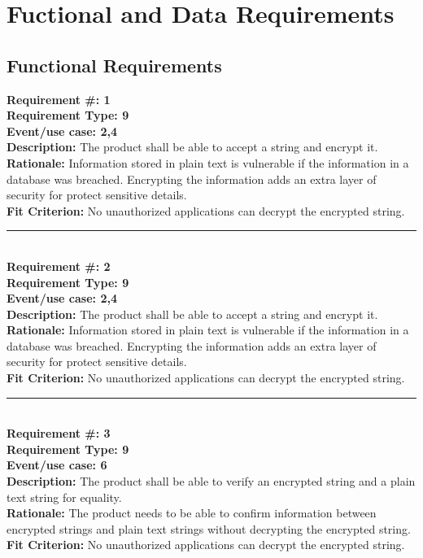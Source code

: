 \documentclass[12pt]{article}
\begin{document}
\section{Fuctional and Data Requirements}

\subsection{Functional Requirements}

	\textbf{Requirement \#: 1}\\
	\textbf{Requirement Type: 9	}\\
	\textbf{Event/use case: 2,4}\\
	\textbf{Description:} The product shall be able to accept a string and encrypt it.\\
	\textbf{Rationale:} Information stored in plain text is vulnerable if the information in a database was breached. Encrypting the information adds an extra layer of security for protect sensitive details.\\
	\textbf{Fit Criterion:} No unauthorized applications can decrypt the encrypted string.



	\noindent\rule{12cm}{0.4pt} \\ 

	\noindent\textbf{Requirement \#: 2}\\
	\textbf{Requirement Type: 9	}\\
	\textbf{Event/use case: 2,4}\\
	\textbf{Description:} The product shall be able to accept a string and encrypt it.\\
	\textbf{Rationale:} Information stored in plain text is vulnerable if the information in a database was breached. Encrypting the information adds an extra layer of security for protect sensitive details.\\
	\textbf{Fit Criterion:} No unauthorized applications can decrypt the encrypted string.

	\noindent\rule{12cm}{0.4pt} \\

	\noindent\textbf{Requirement \#: 3}\\
	\textbf{Requirement Type: 9	}\\
	\textbf{Event/use case: 6}\\
	\textbf{Description:} The product shall be able to verify an encrypted string and a plain text string for equality.\\
	\textbf{Rationale:} The product needs to be able to confirm information between encrypted strings and plain text strings without decrypting the encrypted string.\\
	\textbf{Fit Criterion:} No unauthorized applications can decrypt the encrypted string.\\
\end{document}
